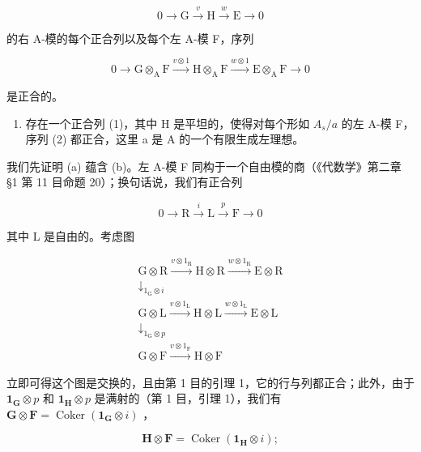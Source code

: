 \[
0 \longrightarrow \mathrm{G} \stackrel {v} {\longrightarrow} \mathrm{H} \stackrel {w} {\longrightarrow} \mathrm{E} \longrightarrow 0\tag{1}
\]

的右 A-模的每个正合列以及每个左 A-模 F，序列

\[
0 \longrightarrow \mathrm{G} \otimes_ {\mathrm{A}} \mathrm{F} \xrightarrow {v \otimes 1} \mathrm{H} \otimes_ {\mathrm{A}} \mathrm{F} \xrightarrow {w \otimes 1} \mathrm{E} \otimes_ {\mathrm{A}} \mathrm{F} \longrightarrow 0\tag{2}
\]

是正合的。

\begin{enumerate}
\def\labelenumi{(\alph{enumi})}
\setcounter{enumi}{2}
\tightlist
\item
  存在一个正合列 (1)，其中 H 是平坦的，使得对每个形如 \(A_{s}/a\) 的左 A-模 F，序列 (2) 都正合，这里 a 是 A 的一个有限生成左理想。
\end{enumerate}

我们先证明 (a) 蕴含 (b)。左 A-模 F 同构于一个自由模的商（《代数学》第二章 §1 第 11 目命题 20）；换句话说，我们有正合列

\[
0 \longrightarrow \mathrm{R} \stackrel {i} {\longrightarrow} \mathrm{L} \stackrel {p} {\longrightarrow} \mathrm{F} \longrightarrow 0
\]

其中 L 是自由的。考虑图

\[
\begin{array}{c} \mathrm{G} \otimes \mathrm{R} \xrightarrow {v \otimes 1 _ {\mathrm{R}}} \mathrm{H} \otimes \mathrm{R} \xrightarrow {w \otimes 1 _ {\mathrm{R}}} \mathrm{E} \otimes \mathrm{R} \\ \downarrow_ {1 _ {\mathrm{G}} \otimes i} \\ \mathrm{G} \otimes \mathrm{L} \xrightarrow {v \otimes 1 _ {\mathrm{L}}} \mathrm{H} \otimes \mathrm{L} \xrightarrow {w \otimes 1 _ {\mathrm{L}}} \mathrm{E} \otimes \mathrm{L} \\ \downarrow_ {1 _ {\mathrm{G}} \otimes p} \\ \mathrm{G} \otimes \mathrm{F} \xrightarrow {v \otimes 1 _ {\mathrm{F}}} \mathrm{H} \otimes \mathrm{F} \end{array}\tag{3}
\]

立即可得这个图是交换的，且由第 1 目的引理 1，它的行与列都正合；此外，由于 \(\mathbf{1}_{\mathbf{G}} \otimes p\) 和 \(\mathbf{1}_{\mathbf{H}} \otimes p\) 是满射的（第 1 目，引理 1），我们有 \(\mathbf{G} \otimes \mathbf{F} = \operatorname{Coker}(\mathbf{1}_{\mathbf{G}} \otimes i)\) ，

\[
\mathbf {H} \otimes \mathbf {F} = \operatorname{Coker} (\mathbf {1} _ {\mathbf {H}} \otimes i);
\]

